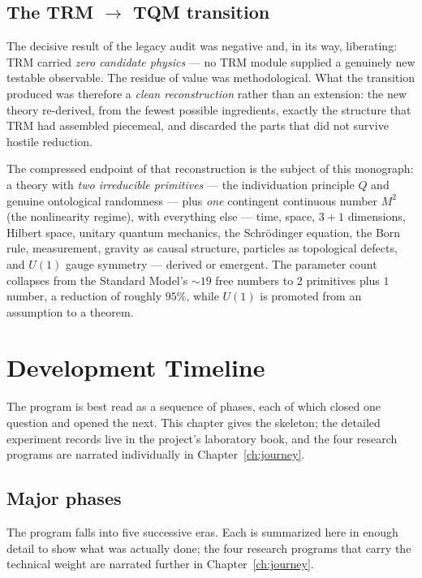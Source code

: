 \documentclass[10pt,twoside,openany]{book}
\begin{document}
\section{The TRM $\to$ TQM transition}

The decisive result of the legacy audit was negative and, in its way, liberating: TRM
carried \emph{zero candidate physics} --- no TRM module supplied a genuinely new testable
observable. The residue of value was methodological. What the transition produced was
therefore a \emph{clean reconstruction} rather than an extension: the new theory
re-derived, from the fewest possible ingredients, exactly the structure that TRM had
assembled piecemeal, and discarded the parts that did not survive hostile reduction.

The compressed endpoint of that reconstruction is the subject of this monograph: a theory
with \emph{two irreducible primitives} --- the individuation principle $Q$ and genuine
ontological randomness --- plus \emph{one} contingent continuous number $M^2$ (the
nonlinearity regime), with everything else --- time, space, $3{+}1$ dimensions, Hilbert
space, unitary quantum mechanics, the Schr\"odinger equation, the Born rule, measurement,
gravity as causal structure, particles as topological defects, and $U(1)$ gauge symmetry
--- derived or emergent. The parameter count collapses from the Standard Model's
$\sim19$ free numbers to $2$ primitives plus $1$ number, a reduction of roughly $95\%$,
while $U(1)$ is promoted from an assumption to a theorem.

\chapter{Development Timeline}
\label{ch:timeline}

The program is best read as a sequence of phases, each of which closed one question and
opened the next. This chapter gives the skeleton; the detailed experiment records live in
the project's laboratory book, and the four research programs are narrated individually
in Chapter~\ref{ch:journey}.

\section{Major phases}

The program falls into five successive eras. Each is summarized here in enough detail to
show what was actually done; the four research programs that carry the technical weight
are narrated further in Chapter~\ref{ch:journey}.
\end{document}
